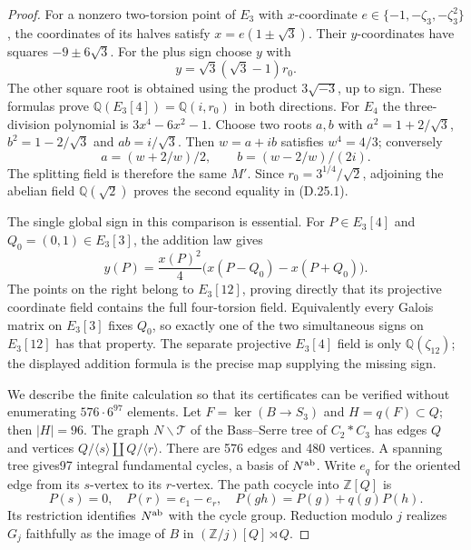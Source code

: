 \begin{proof}
For a nonzero two-torsion point of $E_3$ with $x$-coordinate
$e\in\{-1,-\zeta_3,-\zeta_3^2\}$, the coordinates of its halves
satisfy $x=e(1\pm\sqrt3)$. Their $y$-coordinates have squares
$-9\pm6\sqrt3$. For the plus sign choose $y$ with
\[
 y=\sqrt3(\sqrt3-1)r_0.
\]
The other square root is obtained using the product
$3\sqrt{-3}$, up to sign. These formulas prove
$\mathbb Q(E_3[4])=\mathbb Q(i,r_0)$ in both directions.
For $E_4$ the three-division polynomial is
$3x^4-6x^2-1$. Choose two roots $a,b$ with
$a^2=1+2/\sqrt3$, $b^2=1-2/\sqrt3$ and $ab=i/\sqrt3$.
Then $w=a+ib$ satisfies $w^4=4/3$; conversely
\[
 a=(w+2/w)/2,\qquad b=(w-2/w)/(2i).
\]
The splitting field is therefore the same $M'$. Since
$r_0=3^{1/4}/\sqrt2$, adjoining the abelian field
$\mathbb Q(\sqrt2)$ proves the second equality in (D.25.1).

The single global sign in this comparison is essential.
For $P\in E_3[4]$ and $Q_0=(0,1)\in E_3[3]$, the addition law gives
\[
 y(P)=\frac{x(P)^2}{4}
       \bigl(x(P-Q_0)-x(P+Q_0)\bigr).
\]
The points on the right belong to $E_3[12]$, proving directly
that its projective coordinate field contains the full
four-torsion field. Equivalently every Galois matrix on $E_3[3]$
fixes $Q_0$, so exactly one of the two simultaneous signs on
$E_3[12]$ has that property. The separate projective
$E_3[4]$ field is only $\mathbb Q(\zeta_{12})$; the displayed
addition formula is the precise map supplying the missing sign.

We describe the finite calculation so that its certificates
can be verified without enumerating $576\cdot6^{97}$ elements.
Let $F=\ker(B\to S_3)$ and $H=q(F)\subset Q$; then $|H|=96$.
The graph $N\backslash\mathcal T$ of the Bass--Serre tree of
$C_2*C_3$ has edges $Q$ and vertices
$Q/\langle s\rangle\amalg Q/\langle r\rangle$.
There are 576 edges and 480 vertices. A spanning tree gives97
integral fundamental cycles, a basis of $N^{\rm ab}$.
Write $e_q$ for the oriented edge from its $s$-vertex to its
$r$-vertex. The path cocycle into $\mathbb Z[Q]$ is
\[
 P(s)=0,\quad P(r)=e_1-e_r,\quad
 P(gh)=P(g)+q(g)P(h).                                    \tag{D.25.4}
\]
Its restriction identifies $N^{\rm ab}$ with the cycle group.
Reduction modulo $j$ realizes $G_j$ faithfully as the image
of $B$ in $(\mathbb Z/j)[Q]\rtimes Q$.


\end{proof}
